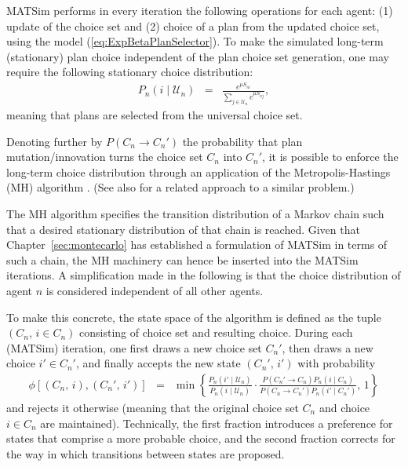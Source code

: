 MATSim performs in every iteration the following operations for each
agent: (1) update of the choice set and (2) choice of a plan from
the updated choice set, using the model (\ref{eq:ExpBetaPlanSelector}).
To make the simulated long-term (stationary) plan choice independent
of the plan choice set generation, one may require the following stationary
choice distribution:
\begin{eqnarray}
P_{n}(i\mid \mathcal{U}_n) & = & \frac{e^{\mu S_{ni}}}{\sum_{j\in \mathcal{U}_n}e^{\mu S_{nj}}},
\label{eq:global-choice-model}
\end{eqnarray}
meaning that plans are selected from the universal choice set.

Denoting further by $P(C_{n}\rightarrow C_{n}')$ the probability
that plan mutation/innovation turns the choice set $C_{n}$ into $C_{n}'$,
it is possible to enforce the long-term choice distribution 
through an application of the Metropolis-Hastings (MH) algorithm \citep{hastings-1970}.
(See also \citet{floetteroed-2012b} for a related approach to a similar
problem.) 

The MH algorithm specifies the transition distribution
of a Markov chain such that a desired stationary distribution of that
chain is reached. Given that Chapter~\ref{sec:montecarlo} has established
a formulation of MATSim in terms of such a chain, the MH machinery can
hence be inserted into the MATSim iterations. A simplification made in
the following is that the choice distribution of agent $n$ is considered
independent of all other agents.

To make this concrete, the state space of the algorithm is defined as the tuple
$(C_{n},\, i\in C_{n})$ consisting of choice set and resulting choice.
During each (MATSim) iteration, one first draws a new choice set $C_{n}'$,
then draws a new choice $i'\in C_{n}'$, and finally accepts the new
state $(C_{n}',\, i')$ with probability
\begin{eqnarray}
\phi[(C_{n},\, i),(C_{n}',\, i')] 
& = & 
\min\left\{ 
\frac{{\displaystyle P_{n}(i'\mid \mathcal{U}_n)}}
{{\displaystyle P_{n}(i\mid \mathcal{U}_n)}}
\cdot
\frac{{P(C_{n}'\rightarrow C_{n})P_n(i\mid C_{n})}}
{{P(C_{n}\rightarrow C_{n}')P_n(i'\mid C_{n}')}}
,\,1\right\} 
\label{eq:accept-proba-1}
\end{eqnarray}
and rejects it otherwise (meaning that the original choice set $C_{n}$
and choice $i\in C_{n}$ are maintained).
Technically, the first fraction introduces a preference for states
that comprise a more probable choice, and the second
fraction corrects for the way in which transitions between states are
proposed.

